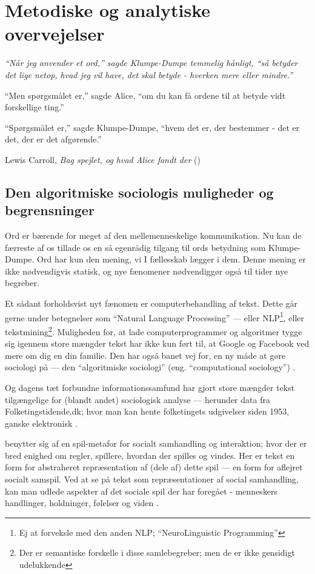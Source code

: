 \part{Metodiske og analytiske overvejelser}\label{part:method}

\epigraph{\itshape
“Når jeg anvender et ord,” sagde Klumpe-Dumpe temmelig hånligt, “så betyder det lige netop, hvad jeg vil have, det skal betyde - hverken mere eller mindre.”

“Men spørgsmålet er,” sagde Alice, “om du kan få ordene til at betyde vidt forskellige ting.”

“Spørgsmålet er,” sagde Klumpe-Dumpe, “hvem det er, der bestemmer - det er det, der er det afgørende.”
}{Lewis Carroll, \textit{Bag spejlet, og hvad Alice fandt der} (\citeyear{carrollAliceEventyrlandOg1977})}

\chapter{Den algoritmiske sociologis muligheder og begrensninger}

Ord er bærende for meget af den mellemenneskelige kommunikation.
Nu kan de færreste af os tillade os en så egenrådig tilgang til ords betydning som Klumpe-Dumpe.
Ord har kun den mening, vi I fællesskab lægger i dem.
Denne mening er ikke nødvendigvis statisk, og nye fænomener nødvendiggør også til tider nye begreber.

Et sådant forholdsvist nyt fænomen er computerbehandling af tekst.
Dette går gerne under betegnelser som “Natural Language Processing” — eller NLP\footnote{Ej at forveksle med den anden NLP; “NeuroLinguistic Programming”}, eller tekstmining\footnote{Der er semantiske forskelle i disse samlebegreber; men de er ikke gensidigt udelukkende}.
Muligheden for, at lade computerprogrammer og algoritmer tygge sig igennem store mængder tekst har ikke kun ført til, at Google og Facebook ved mere om dig en din familie.
Den har også banet vej for, en ny måde at gøre sociologi på — den “algoritmiske sociologi” (eng. “computational sociology”) \autocite{evansComputationSociologicalImagination2019}.

Og dagens tæt forbundne informationssamfund har gjort store mængder tekst tilgængelige for (blandt andet) sociologisk analyse --- herunder data fra Folketingstidende.dk; hvor man kan hente folketingets udgivelser siden 1953, ganske elektronisk \autocite{folketingstidendeOmFolketingstidende}.

\citeauthor{evansMachineTranslationMining2016} benytter sig af en spil-metafor for socialt samhandling og interaktion; hvor der er bred enighed om regler, spillere, hvordan der spilles og vindes.
Her er tekst en form for abstraheret repræsentation af (dele af) dette spil --- en form for aflejret socialt samspil.
Ved at se på tekst som repræsentationer af social samhandling, kan man udlede aspekter af det sociale spil der har foregået - menneskers handlinger, holdninger, følelser og viden \autocite[s. 22]{evansMachineTranslationMining2016}.

